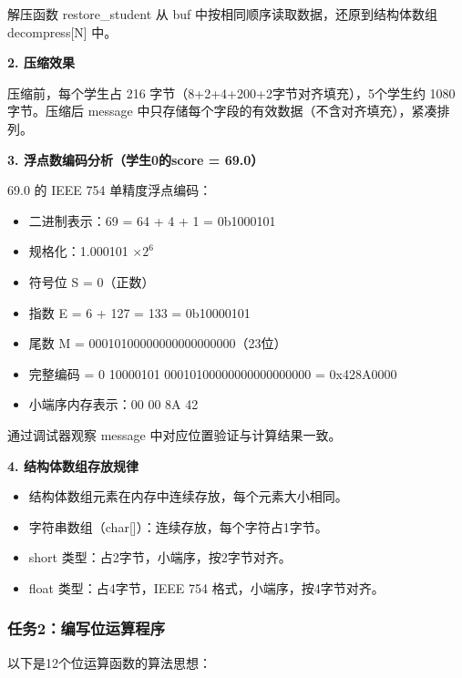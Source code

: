\documentclass[12pt,a4paper]{ctexart}
\begin{document}
解压函数 restore\_student 从 buf 中按相同顺序读取数据，还原到结构体数组 decompress[N] 中。

\textbf{2. 压缩效果}

压缩前，每个学生占 216 字节（8+2+4+200+2字节对齐填充），5个学生约 1080 字节。压缩后 message 中只存储每个字段的有效数据（不含对齐填充），紧凑排列。

\textbf{3. 浮点数编码分析（学生0的score = 69.0）}

69.0 的 IEEE 754 单精度浮点编码：
\begin{itemize}[nosep]
    \item 二进制表示：69 = 64 + 4 + 1 = 0b1000101
    \item 规格化：1.000101 $\times 2^6$
    \item 符号位 S = 0（正数）
    \item 指数 E = 6 + 127 = 133 = 0b10000101
    \item 尾数 M = 00010100000000000000000（23位）
    \item 完整编码 = 0 10000101 00010100000000000000000 = 0x428A0000
    \item 小端序内存表示：00 00 8A 42
\end{itemize}

通过调试器观察 message 中对应位置验证与计算结果一致。

\textbf{4. 结构体数组存放规律}
\begin{itemize}[nosep]
    \item 结构体数组元素在内存中连续存放，每个元素大小相同。
    \item 字符串数组（char[]）：连续存放，每个字符占1字节。
    \item short 类型：占2字节，小端序，按2字节对齐。
    \item float 类型：占4字节，IEEE 754 格式，小端序，按4字节对齐。
\end{itemize}

\subsubsection*{任务2：编写位运算程序}

以下是12个位运算函数的算法思想：
\end{document}
